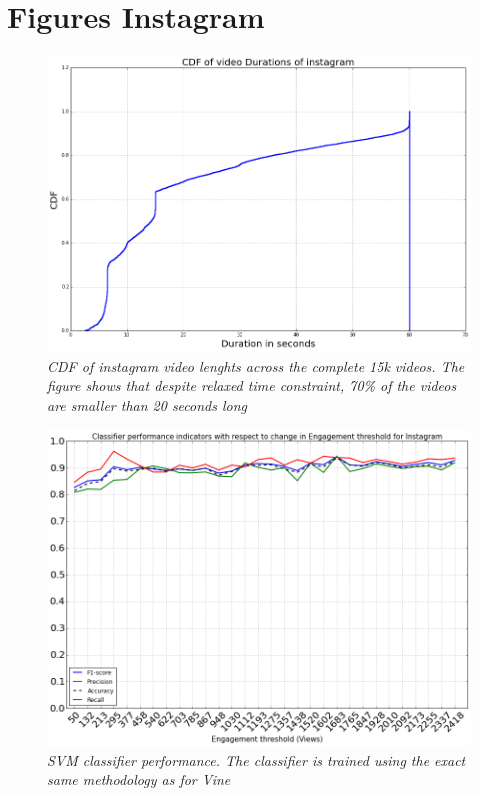 \section{Figures Instagram}

\begin{figure}[!htb]
	\centering
	\includegraphics[width=\columnwidth]{plots/VideoDurationInsta.png}
	\caption{\textsl{CDF of instagram video lenghts across the complete 15k videos. The figure shows that despite relaxed time constraint, 70\% of the videos are smaller than 20 seconds long}}
	\label{fig:Face_Thirds}
\end{figure}


\begin{figure}[!htb]
	\centering
	\includegraphics[width=\columnwidth]{plots/InstaClassifierPerf.png}
	\caption{\textsl{SVM classifier performance. The classifier is trained using the exact same methodology as for Vine}}
	\label{fig:Face_Thirds}
\end{figure}


